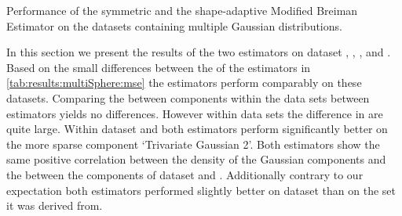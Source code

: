 \begin{table}
	\centering
	
	\caption{Performance of the symmetric and the shape-adaptive Modified Breiman Estimator on the datasets containing multiple Gaussian distributions.} 	
	\label{tab:results:multiSphere:mse}
\end{table}

In this section we present the results of the two estimators on dataset \ferdosiTwo, \baakmanTwo, \ferdosiThree, and \baakmanThree.
	Based on the small differences between the \mses of the estimators in \cref{tab:results:multiSphere:mse} the estimators perform comparably on these datasets. 
	Comparing the \MSE between components within the data sets between estimators yields no differences. However within data sets the difference in \mses are quite large.
	Within dataset \ferdosiTwo and \baakmanTwo both estimators perform significantly better on the more sparse component `Trivariate Gaussian 2'.
	Both estimators show the same positive correlation between the density of the Gaussian components and the \MSE between the components of dataset \ferdosiThree and \baakmanThree. Additionally contrary to our expectation both estimators performed slightly better on dataset \baakmanThree than on the set it was derived from. 

